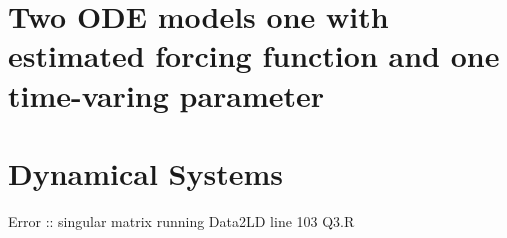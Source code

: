 \documentclass[a4paper]{article}
\begin{document}
\section{Two ODE models one with estimated forcing function and one time-varing parameter}

\section{Dynamical Systems}
Error :: singular matrix running Data2LD line 103 Q3.R

%   
% 
% 
%   
%    
%    
%    
\end{document}
